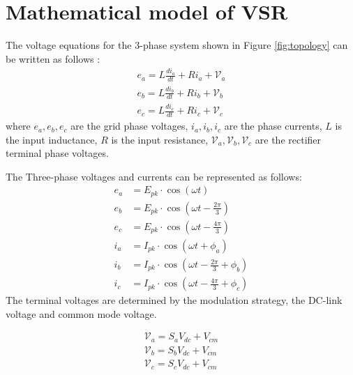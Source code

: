\section{Mathematical model of VSR}
The voltage equations for the 3-phase system shown in Figure \ref{fig:topology} can be written as follows \cite{wang2015pid,electronics12112417}:
\begin{equation}
    \begin{gathered}
        e_{a} = L \frac{di_a}{dt} + R i_a + \mathcal{V}_a\\
        e_{b} = L \frac{di_b}{dt} + R i_b + \mathcal{V}_b\\
        e_{c} = L \frac{di_c}{dt} + R i_c + \mathcal{V}_c
    \end{gathered}
    \label{eq:voltage_eq}
\end{equation}
where $e_{a}, e_{b}, e_{c}$ are the grid phase voltages, $i_a, i_b, i_c$ are the phase currents, $L$ is the input inductance,
$R$ is the input resistance, $\mathcal{V}_a, \mathcal{V}_b, \mathcal{V}_c$ are the rectifier terminal phase voltages.\par
The Three-phase voltages and currents can be represented as follows:
\begin{equation}
    \begin{split}
        e_a &= E_{pk} \cdot \cos(\omega t) \\
        e_b &= E_{pk} \cdot \cos(\omega t - \frac{2\pi}{3}) \\
        e_c &= E_{pk} \cdot \cos(\omega t - \frac{4\pi}{3}) \\
        i_a &= I_{pk} \cdot \cos(\omega t + \phi_a) \\
        i_b &= I_{pk} \cdot \cos(\omega t - \frac{2\pi}{3} + \phi_b) \\
        i_c &= I_{pk} \cdot \cos(\omega t - \frac{4\pi}{3} + \phi_c)
    \end{split}
\end{equation}
The terminal voltages are determined by the modulation strategy, the DC-link voltage and common mode voltage.\par
\begin{equation}
    \begin{gathered}
        \mathcal{V}_a = S_a V_{dc} + V_{cm}\\
        \mathcal{V}_b = S_b V_{dc} + V_{cm}\\
        \mathcal{V}_c = S_c V_{dc} + V_{cm}
    \end{gathered}
    \label{eq:common_mode_voltage}
\end{equation}
